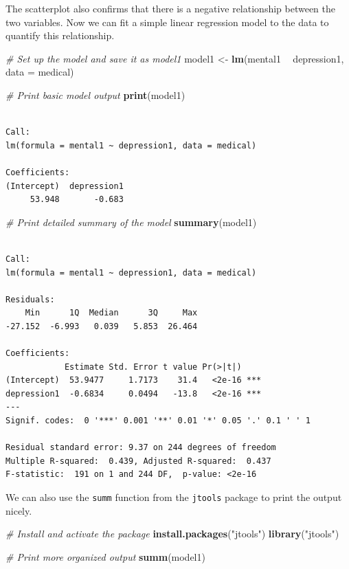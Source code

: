\documentclass[]{book}
\newenvironment{Shaded}{\begin{snugshade}}{\end{snugshade}}
\newcommand{\CommentTok}[1]{\textcolor[rgb]{0.56,0.35,0.01}{\textit{#1}}}
\newcommand{\DataTypeTok}[1]{\textcolor[rgb]{0.13,0.29,0.53}{#1}}
\newcommand{\KeywordTok}[1]{\textcolor[rgb]{0.13,0.29,0.53}{\textbf{#1}}}
\newcommand{\NormalTok}[1]{#1}
\newcommand{\OperatorTok}[1]{\textcolor[rgb]{0.81,0.36,0.00}{\textbf{#1}}}
\newcommand{\StringTok}[1]{\textcolor[rgb]{0.31,0.60,0.02}{#1}}
\begin{document}
The scatterplot also confirms that there is a negative relationship between the two variables. Now we can fit a simple linear regression model to the data to quantify this relationship.

\begin{Shaded}
\begin{Highlighting}[]
\CommentTok{# Set up the model and save it as model1}
\NormalTok{model1 <-}\StringTok{ }\KeywordTok{lm}\NormalTok{(mental1 }\OperatorTok{~}\StringTok{ }\NormalTok{depression1, }\DataTypeTok{data =}\NormalTok{ medical)}

\CommentTok{# Print basic model output}
\KeywordTok{print}\NormalTok{(model1)}
\end{Highlighting}
\end{Shaded}

\begin{verbatim}

Call:
lm(formula = mental1 ~ depression1, data = medical)

Coefficients:
(Intercept)  depression1  
     53.948       -0.683  
\end{verbatim}

\begin{Shaded}
\begin{Highlighting}[]
\CommentTok{# Print detailed summary of the model}
\KeywordTok{summary}\NormalTok{(model1)}
\end{Highlighting}
\end{Shaded}

\begin{verbatim}

Call:
lm(formula = mental1 ~ depression1, data = medical)

Residuals:
    Min      1Q  Median      3Q     Max 
-27.152  -6.993   0.039   5.853  26.464 

Coefficients:
            Estimate Std. Error t value Pr(>|t|)    
(Intercept)  53.9477     1.7173    31.4   <2e-16 ***
depression1  -0.6834     0.0494   -13.8   <2e-16 ***
---
Signif. codes:  0 '***' 0.001 '**' 0.01 '*' 0.05 '.' 0.1 ' ' 1

Residual standard error: 9.37 on 244 degrees of freedom
Multiple R-squared:  0.439, Adjusted R-squared:  0.437 
F-statistic:  191 on 1 and 244 DF,  p-value: <2e-16
\end{verbatim}

We can also use the \texttt{summ} function from the \texttt{jtools} package \citep{R-jtools} to print the output nicely.

\begin{Shaded}
\begin{Highlighting}[]
\CommentTok{# Install and activate the package}
\KeywordTok{install.packages}\NormalTok{(}\StringTok{"jtools"}\NormalTok{)}
\KeywordTok{library}\NormalTok{(}\StringTok{"jtools"}\NormalTok{)}

\CommentTok{# Print more organized output}
\KeywordTok{summ}\NormalTok{(model1)}
\end{Highlighting}
\end{Shaded}
\end{document}
